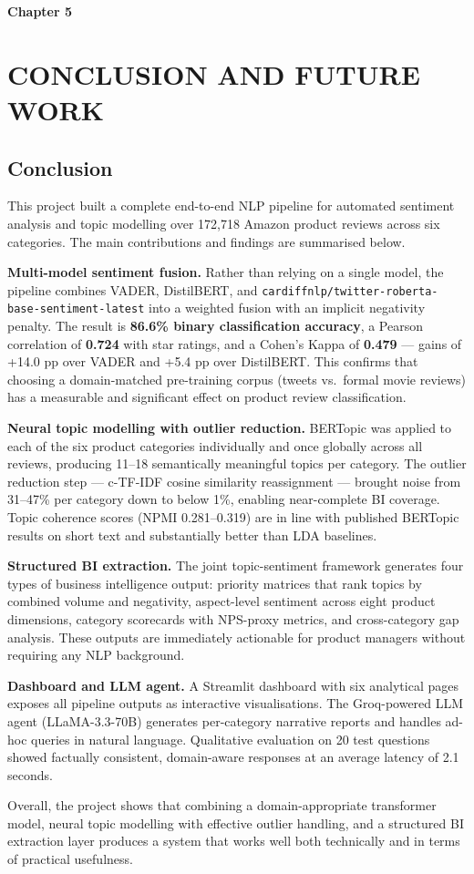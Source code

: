 \newpage
\textbf{\huge Chapter 5}
\section{CONCLUSION AND FUTURE WORK}

\subsection{Conclusion}
\begin{justify}
This project built a complete end-to-end NLP pipeline for automated sentiment analysis and topic modelling over 172,718 Amazon product reviews across six categories. The main contributions and findings are summarised below.

\textbf{Multi-model sentiment fusion.} Rather than relying on a single model, the pipeline combines VADER, DistilBERT, and \texttt{cardiffnlp/twitter-roberta-base-\allowbreak{}sentiment-latest} into a weighted fusion with an implicit negativity penalty. The result is \textbf{86.6\% binary classification accuracy}, a Pearson correlation of \textbf{0.724} with star ratings, and a Cohen's Kappa of \textbf{0.479} — gains of +14.0 pp over VADER and +5.4 pp over DistilBERT. This confirms that choosing a domain-matched pre-training corpus (tweets vs.\ formal movie reviews) has a measurable and significant effect on product review classification.

\textbf{Neural topic modelling with outlier reduction.} BERTopic was applied to each of the six product categories individually and once globally across all reviews, producing 11--18 semantically meaningful topics per category. The outlier reduction step — c-TF-IDF cosine similarity reassignment — brought noise from 31--47\% per category down to below 1\%, enabling near-complete BI coverage. Topic coherence scores (NPMI 0.281--0.319) are in line with published BERTopic results on short text and substantially better than LDA baselines.

\textbf{Structured BI extraction.} The joint topic-sentiment framework generates four types of business intelligence output: priority matrices that rank topics by combined volume and negativity, aspect-level sentiment across eight product dimensions, category scorecards with NPS-proxy metrics, and cross-category gap analysis. These outputs are immediately actionable for product managers without requiring any NLP background.

\textbf{Dashboard and LLM agent.} A Streamlit dashboard with six analytical pages exposes all pipeline outputs as interactive visualisations. The Groq-powered LLM agent (LLaMA-3.3-70B) generates per-category narrative reports and handles ad-hoc queries in natural language. Qualitative evaluation on 20 test questions showed factually consistent, domain-aware responses at an average latency of 2.1 seconds.

Overall, the project shows that combining a domain-appropriate transformer model, neural topic modelling with effective outlier handling, and a structured BI extraction layer produces a system that works well both technically and in terms of practical usefulness.
\end{justify}

